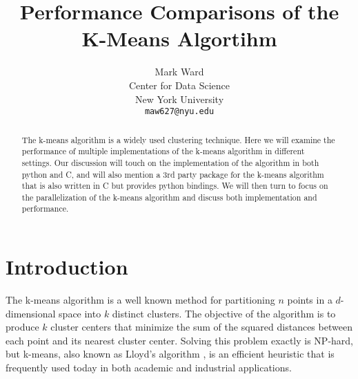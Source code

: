 \documentclass[10pt,twocolumn,letterpaper]{article}
\begin{document}
\title{Performance Comparisons of the K-Means Algortihm}

\author{
Mark Ward\\
Center for Data Science\\
New York University\\
{\tt\small maw627@nyu.edu}
}

\maketitle



\begin{abstract}
The k-means algorithm is a widely used clustering technique. Here we will examine the performance of multiple implementations of the k-means algorithm in different settings. Our discussion will touch on the implementation of the algorithm in both python and C, and will also mention a 3rd party package for the k-means algorithm that is also written in C but provides python bindings. We will then turn to focus on the parallelization of the k-means algorithm and discuss both implementation and performance. 
\end{abstract}

\section{Introduction}
The k-means algorithm is a well known method for partitioning $n$ points in a $d$-dimensional space into $k$ distinct clusters. The objective of the algorithm is to produce $k$ cluster centers that minimize the sum of the squared distances between each point and its nearest cluster center. Solving this problem exactly is NP-hard, but k-means, also known as Lloyd's algorithm \cite{lloyd1982least}, is an efficient heuristic that is frequently used today in both academic and industrial applications. 
\end{document}
